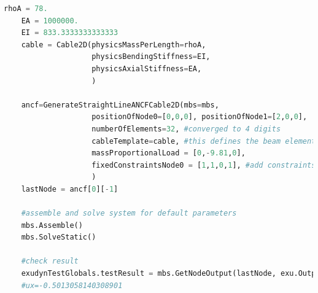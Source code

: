 \begin{lstlisting}[language=Python, firstnumber=1]
    rhoA = 78.
    EA = 1000000.
    EI = 833.3333333333333
    cable = Cable2D(physicsMassPerLength=rhoA, 
                    physicsBendingStiffness=EI, 
                    physicsAxialStiffness=EA, 
                    )

    ancf=GenerateStraightLineANCFCable2D(mbs=mbs,
                    positionOfNode0=[0,0,0], positionOfNode1=[2,0,0],
                    numberOfElements=32, #converged to 4 digits
                    cableTemplate=cable, #this defines the beam element properties
                    massProportionalLoad = [0,-9.81,0],
                    fixedConstraintsNode0 = [1,1,0,1], #add constraints for pos and rot (r'_y)
                    )
    lastNode = ancf[0][-1]

    #assemble and solve system for default parameters
    mbs.Assemble()
    mbs.SolveStatic()

    #check result
    exudynTestGlobals.testResult = mbs.GetNodeOutput(lastNode, exu.OutputVariableType.Displacement)[0]
    #ux=-0.5013058140308901
\end{lstlisting}

